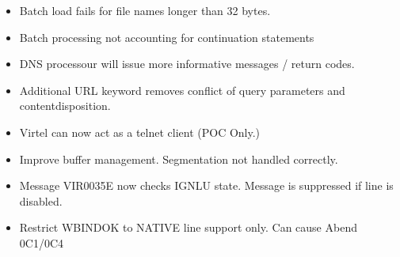 \documentclass[letterpaper,10pt,english]{sphinxmanual}
\begin{document}
\begin{itemize}
\item {} 
Batch load fails for file names longer than 32 bytes.

\end{itemize}

\begin{itemize}
\item {} 
Batch processing not accounting for continuation statements

\end{itemize}

\begin{itemize}
\item {} 
DNS processour will issue more informative messages / return codes.

\end{itemize}

\begin{itemize}
\item {} 
Additional URL keyword removes conflict of query parameters and content\sphinxhyphen{}disposition.

\end{itemize}

\begin{itemize}
\item {} 
Virtel can now act as a telnet client (POC Only.)

\end{itemize}

\begin{itemize}
\item {} 
Improve buffer management. Segmentation not handled correctly.

\end{itemize}

\begin{itemize}
\item {} 
Message VIR0035E now checks IGNLU state. Message is suppressed if line is disabled.

\end{itemize}

\begin{itemize}
\item {} 
Restrict WBINDOK to NATIVE line support only. Can cause Abend 0C1/0C4

\end{itemize}
\end{document}
